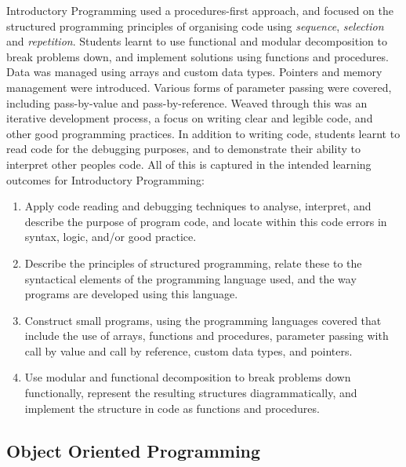 
Introductory Programming used a procedures-first approach, and focused on the structured programming principles of organising code using \emph{sequence}, \emph{selection} and \emph{repetition}. Students learnt to use functional and modular decomposition to break problems down, and implement solutions using functions and procedures. Data was managed using arrays and custom data types. Pointers and memory management were introduced. Various forms of parameter passing were covered, including pass-by-value and pass-by-reference. Weaved through this was an iterative development process, a focus on writing clear and legible code, and other good programming practices. In addition to writing code, students learnt to read code for the debugging purposes, and to demonstrate their ability to interpret other peoples code. All of this is captured in the intended learning outcomes for Introductory Programming:
\begin{enumerate}
	\item Apply code reading and debugging techniques to analyse, interpret, and describe the purpose of program code, and locate within this code errors in syntax, logic, and/or good practice.
	\item Describe the principles of structured programming, relate these to the syntactical elements of the programming language used, and the way programs are developed using this language.
	\item Construct small programs, using the programming languages covered that include the use of arrays, functions and procedures, parameter passing with call by value and call by reference, custom data types, and pointers.
	\item Use modular and functional decomposition to break problems down functionally, represent the resulting structures diagrammatically, and implement the structure in code as functions and procedures.
\end{enumerate}







\subsection{Object Oriented Programming} %
\label{sub:object_oriented_programming}

